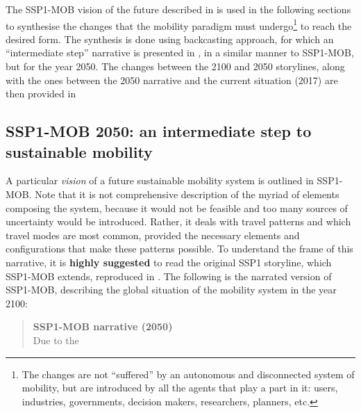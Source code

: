 The SSP1-MOB vision of the future described in  is used in the following sections to synthesise the changes that the mobility paradigm must undergo\footnote{The changes are not ``suffered'' by an autonomous and disconnected system of mobility, but are introduced by all the agents that play a part in it: users, industries, governments, decision makers, researchers, planners, etc.} to reach the desired form. The synthesis is done using backcasting approach, for which an ``intermediate step'' narrative is presented in , in a similar manner to SSP1-MOB, but for the year 2050. The changes between the 2100 and 2050 storylines, along with the ones between the 2050 narrative and the current situation (2017) are then provided in 

\subsection{SSP1-MOB 2050: an intermediate step to sustainable mobility}
\label{ss:results:backcasting-2050-intermediate-step}
A particular \emph{vision} of a future sustainable mobility system is outlined in SSP1-MOB. Note that it is not comprehensive description of the myriad of elements composing the system, because it would not be feasible and too many sources of uncertainty would be introduced. Rather, it deals with travel patterns and which travel modes are most common, provided the necessary elements and configurations that make these patterns possible. To understand the frame of this narrative, it is \textbf{highly suggested} to read the original SSP1 storyline, which SSP1-MOB extends, reproduced in . The following is the narrated version of SSP1-MOB, describing the global situation of the mobility system in the year 2100:
%
\blockquote{\sffamily \textbf{SSP1-MOB narrative (2050)}\\Due to the 
}

